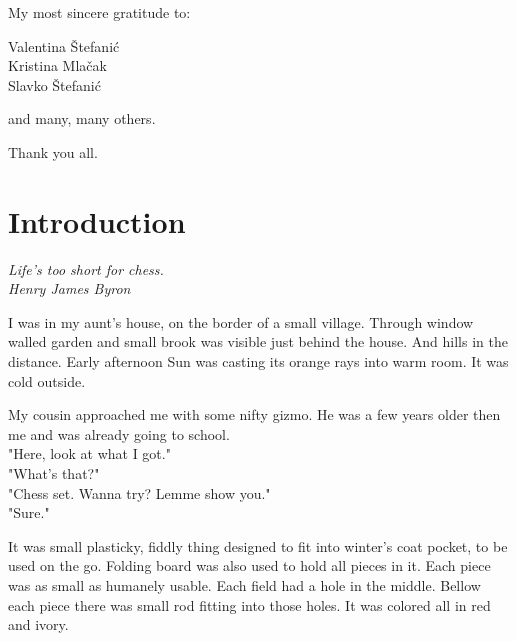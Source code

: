 \documentclass[a5paper,12pt,draft]{book}
\begin{document}
\thispagestyle{empty}
\vspace*{0.2\textheight}
\begin{flushright}
My most sincere gratitude to:

Valentina Štefanić \\
Kristina Mlačak \\
Slavko Štefanić

and many, many others.

Thank you all.
\end{flushright}
\clearpage

\thispagestyle{empty}
\vspace*{0.1\textheight}
\clearpage

\chapter*{Introduction}

\begin{flushright}
\emph{Life's too short for chess. \\
\textperiodcentered \textperiodcentered \textperiodcentered \hspace*{0.2em} Henry James Byron}
\end{flushright}

I was in my aunt's house, on the border of a small village.
Through window walled garden and small brook was visible just
behind the house. And hills in the distance. Early afternoon Sun
was casting its orange rays into warm room. It was cold outside.

My cousin approached me with some nifty gizmo. He was a
few years older then me and was already going to school. \\
"Here, look at what I got." \\
"What's that?" \\
"Chess set. Wanna try? Lemme show you." \\
"Sure."

It was small plasticky, fiddly thing designed to fit into winter's
coat pocket, to be used on the go. Folding board was also used to
hold all pieces in it. Each piece was as small as humanely usable.
Each field had a hole in the middle. Bellow each piece there was
small rod fitting into those holes. It was colored all in red and ivory.
\end{document}
